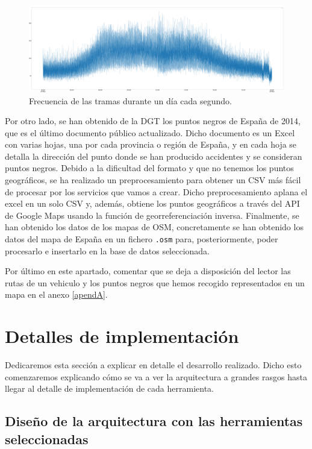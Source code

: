 \begin{figure}[htp]
\centering
\includegraphics[scale=0.26]{Imagenes/graf3.png}
\caption{Frecuencia de las tramas durante un día cada segundo.}
\label{graf1sec}
\end{figure}


Por otro lado, se han obtenido de la DGT los puntos negros de España de
2014, que es el último documento público actualizado. Dicho documento es un
Excel con varias hojas, una por cada provincia o región de España, y en
cada hoja se detalla la dirección del punto donde se han producido
accidentes y se consideran puntos negros. Debido a la dificultad del
formato y que no tenemos los puntos geográficos, se ha realizado un
preprocesamiento para obtener un CSV más fácil de procesar por los
servicios que vamos a crear. Dicho preprocesamiento aplana el excel en un
solo CSV y, además, obtiene los puntos geográficos a través del API de
Google Maps usando la función de georreferenciación inversa. Finalmente, se
han obtenido los datos de los mapas de OSM, concretamente se han obtenido
los datos del mapa de España en un fichero {\tt .osm} para, posteriormente,
poder procesarlo e insertarlo en la base de datos seleccionada.

Por último en este apartado, comentar que se deja a disposición del lector
las rutas de un vehiculo y los puntos negros que hemos recogido
representados en un mapa en el anexo \ref{apendA}.

\section{Detalles de implementación\label{implementacion}}

Dedicaremos esta sección a explicar en detalle el desarrollo realizado.
Dicho esto comenzaremos explicando cómo se va a ver la arquitectura a
grandes rasgos hasta llegar al detalle de implementación de cada
herramienta.

\subsection{Diseño de la arquitectura con las herramientas seleccionadas\label{disenio}}

